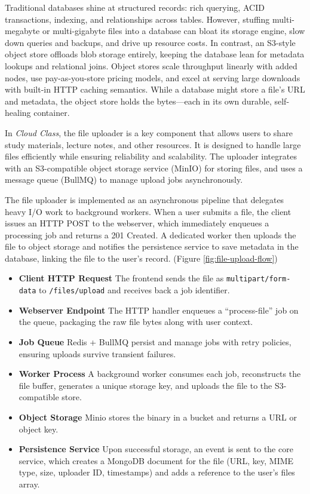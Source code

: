 Traditional databases shine at structured records: rich querying, ACID transactions, indexing, and relationships across tables. However, stuffing multi-megabyte or multi-gigabyte files into a database can bloat its storage engine, slow down queries and backups, and drive up resource costs. In contrast, an S3-style object store offloads blob storage entirely, keeping the database lean for metadata lookups and relational joins. Object stores scale throughput linearly with added nodes, use pay-as-you-store pricing models, and excel at serving large downloads with built-in HTTP caching semantics. While a database might store a file’s URL and metadata, the object store holds the bytes—each in its own durable, self-healing container.

In \emph{Cloud Class}, the file uploader is a key component that allows users to share study materials, lecture notes, and other resources. It is designed to handle large files efficiently while ensuring reliability and scalability. The uploader integrates with an S3-compatible object storage service (MinIO) for storing files, and uses a message queue (BullMQ) to manage upload jobs asynchronously.

The file uploader is implemented as an asynchronous pipeline that delegates heavy I/O work to background workers. When a user submits a file, the client issues an HTTP POST to the webserver, which immediately enqueues a processing job and returns a 201 Created. A dedicated worker then uploads the file to object storage and notifies the persistence service to save metadata in the database, linking the file to the user’s record. (Figure \ref{fig:file-upload-flow})

\begin{itemize}
\item \textbf{Client HTTP Request}
The frontend sends the file as \texttt{multipart/form-data} to \texttt{/files/upload} and receives back a job identifier.
\item \textbf{Webserver Endpoint}
The HTTP handler enqueues a “process-file” job on the queue, packaging the raw file bytes along with user context.
\item \textbf{Job Queue}
Redis + BullMQ persist and manage jobs with retry policies, ensuring uploads survive transient failures.
\item \textbf{Worker Process}
A background worker consumes each job, reconstructs the file buffer, generates a unique storage key, and uploads the file to the S3-compatible store.
\item \textbf{Object Storage}
Minio stores the binary in a bucket and returns a URL or object key.
\item \textbf{Persistence Service}
Upon successful storage, an event is sent to the core service, which creates a MongoDB document for the file (URL, key, MIME type, size, uploader ID, timestamps) and adds a reference to the user’s files array.
\end{itemize}

